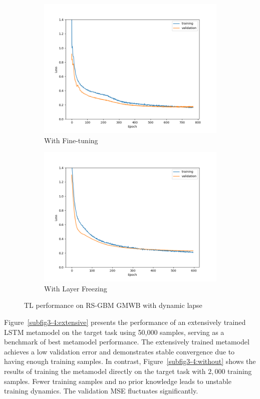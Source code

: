 \begin{figure}[ht!]
\begin{subfigure}{0.48\textwidth}
        \includegraphics[width=\textwidth]{./project3/figures/figure4c.png}
        \caption{With Fine-tuning}
        \label{subfig3-4:fineTuning}
    \end{subfigure}\hfill
    \begin{subfigure}{0.48\textwidth}
        \includegraphics[width=\textwidth]{./project3/figures/figure4d.png}
        \caption{With Layer Freezing}
        \label{subfig3-4:layerFreezing}
    \end{subfigure}
    \caption{TL performance on RS-GBM GMWB with dynamic lapse}
    \label{fig3:figure4}
\end{figure}

Figure~\ref{subfig3-4:extensive} presents the performance of an extensively trained LSTM metamodel on the target task using 50,000 samples, serving as a benchmark of best metamodel performance. 
The extensively trained metamodel achieves a low validation error and demonstrates stable convergence due to having enough training samples. 
In contrast, Figure~\ref{subfig3-4:without} shows the results of training the metamodel directly on the target task with $2,\!000$ training samples. 
Fewer training samples and no prior knowledge leads to unstable training dynamics. 
The validation MSE fluctuates significantly.

